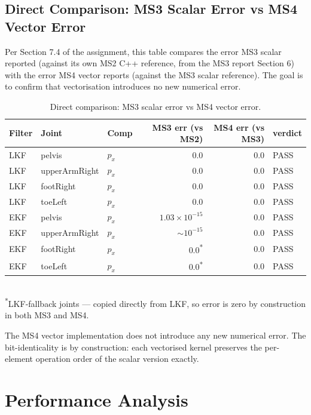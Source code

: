 \documentclass[11pt,a4paper]{article}
\begin{document}
\subsection{Direct Comparison: MS3 Scalar Error vs MS4 Vector Error}

Per Section 7.4 of the assignment, this table compares the error MS3 scalar
reported (against its own MS2 C++ reference, from the MS3 report Section 6)
with the error MS4 vector reports (against the MS3 scalar reference). The
goal is to confirm that vectorisation introduces no new numerical error.

\begin{table}[h]
\centering
\caption{Direct comparison: MS3 scalar error vs MS4 vector error.}
\begin{tabular}{lllrrl}
\toprule
Filter & Joint        & Comp  & MS3 err (vs MS2)  & MS4 err (vs MS3) & verdict \\
\midrule
LKF    & pelvis       & $p_x$ & $0.0$              & $0.0$            & PASS \\
LKF    & upperArmRight & $p_x$ & $0.0$              & $0.0$            & PASS \\
LKF    & footRight    & $p_x$ & $0.0$              & $0.0$            & PASS \\
LKF    & toeLeft      & $p_x$ & $0.0$              & $0.0$            & PASS \\
EKF    & pelvis       & $p_x$ & $1.03 \times 10^{-15}$ & $0.0$        & PASS \\
EKF    & upperArmRight & $p_x$ & $\sim 10^{-15}$  & $0.0$            & PASS \\
EKF    & footRight    & $p_x$ & $0.0$\textsuperscript{*} & $0.0$       & PASS \\
EKF    & toeLeft      & $p_x$ & $0.0$\textsuperscript{*} & $0.0$       & PASS \\
\bottomrule
\end{tabular}\\[0.4em]
\footnotesize\textsuperscript{*}LKF-fallback joints --- copied directly
from LKF, so error is zero by construction in both MS3 and MS4.
\end{table}

The MS4 vector implementation does not introduce any new numerical error.
The bit-identicality is by construction: each vectorised kernel preserves
the per-element operation order of the scalar version exactly.

\section{Performance Analysis}
\end{document}
